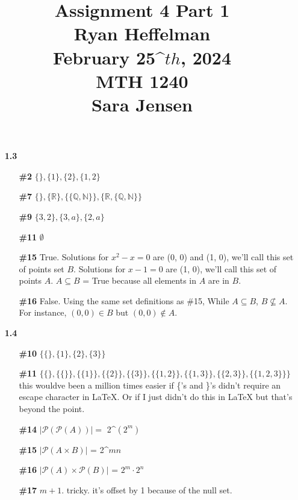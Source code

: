 \documentclass[16pt]{article}
\begin{document}
\large
\date{}
\title{\Large Assignment 4 Part 1 \\ Ryan Heffelman \\ February 25^\(th\), 2024 \\ MTH 1240 \\ Sara Jensen}
\maketitle
\begin{enumerate}
    \item[\textbf{1.3}]
    \item[]
    \begin{enumerate}
        \item[\textbf{\#2}] $\{\}, \{1\}, \{2\}, \{1, 2\}$
        \item[\textbf{\#7}] $\{\}, \{\mathbb{R}\}, \{\{\mathbb{Q}, \mathbb{N}\}\}, \{\mathbb{R}, \{\mathbb{Q}, \mathbb{N}\}\}$
        \item[\textbf{\#9}] $\{3, 2\}, \{3, a\}, \{2, a\}$
        \item[\textbf{\#11}] $\emptyset$
        \item[\textbf{\#15}] True. Solutions for $x^2 - x = 0$ are (0, 0) and (1, 0), we'll call this set of points set $B$. Solutions for $x - 1 = 0$ are (1, 0), we'll call this set of points $A$. $A \subseteq B$ = True because all elements in $A$ are in $B$. 
        \item[\textbf{\#16}] False. Using the same set definitions as \#15, While $A \subseteq B$, $B \nsubseteq A$. For instance, $(0, 0) \in B$ but $(0, 0) \notin A$.
    \end{enumerate}

    \item[\textbf{1.4}]
    \item[]
    \begin{enumerate}
        \item[\textbf{\#10}] $\{\{\}, \{1\}, \{2\}, \{3\}\}$
        \item[\textbf{\#11}] $\{\{\}, \{\{\}\}, \{\{1\}\}, \{\{2\}\}, \{\{3\}\}, \{\{1, 2\}\}, \{\{1, 3\}\}, \{\{2, 3\}\}, \{\{1, 2, 3\}\}\}$ \\ this wouldve been a million times easier if \{'s and \}'s didn't require an escape character in LaTeX. Or if I just didn't do this in LaTeX but that's beyond the point.
        \item[\textbf{\#14}] $\vert \mathscr{P}(\mathscr{P}(A))\vert =$ 2^\((2^m)\)
        \item[\textbf{\#15}] $\vert \mathscr{P}(A \times B)\vert$ = 2^\(mn\)
        \item[\textbf{\#16}] $\vert \mathscr{P}(A) \times \mathscr{P}(B)\vert$ = $2^m \cdot 2^n$
        \item[\textbf{\#17}] $m + 1$. tricky. it's offset by 1 because of the null set.
    \end{enumerate}
\end{enumerate}
\end{document}
